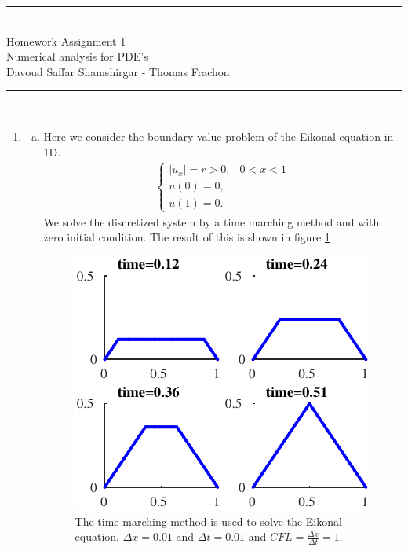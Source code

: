 \documentclass[10pt,a4paper,twoside, french]{article}
\numberwithin{equation}{section}
\numberwithin{figure}{section}
\numberwithin{table}{section}
\begin{document}
	\vspace{1cm}    
    \begin{center}
       		\rule{10cm}{1pt} \\[0.6cm]         %
        	{\huge Homework Assignment 1 \\[0.2cm]
         \Large  Numerical analysis for PDE's\\[0.2cm] 
          \large Davoud Saffar Shamshirgar - Thomas Frachon}  \\[0.6cm]
    		\rule{10cm}{1pt} \\[0.5cm]  
	\end{center}    
	
\setcounter{section}{1}
\begin{enumerate}
\item \begin{enumerate}[a.]
\item Here we consider the boundary value problem of the Eikonal equation in 1D.
\begin{align*}
\left\{
	\begin{array}{ll}
		|u_x|= r >0, & 0<x<1 \\
		u(0) = 0, \\
		u(1) = 0.
	\end{array}
\right.
\end{align*}
We solve the discretized system by a time marching method and with zero initial condition. The result of this is shown in figure \ref{fig:task1}
\begin{figure}[h]
\centering
\includegraphics[scale=1.5]{fig/Task1}
\caption{The time marching method is  used to solve the Eikonal equation. $\Delta x=0.01$ and $\Delta t=0.01$ and $CFL=\frac{\Delta x}{\Delta t}=1$.}
\label{fig:task1}
\end{figure}


\end{enumerate}
\end{enumerate}
\end{document}

